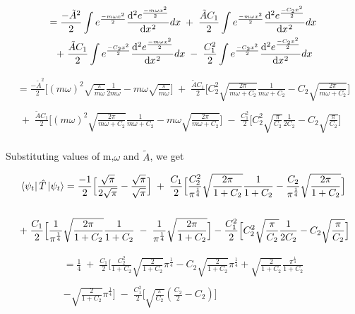 \documentclass[12pt]{article}
\begin{document}
\begin{multline*}   
= \frac{-\tilde{A}^2}{2} \int e^{\frac{-m \omega x^2}{2}} \diff[2]{e^{\frac{-m \omega x^2}{2}}}{x} dx \;+\;  
\frac{\tilde{A}C_1}{2} \int e^{\frac{-m \omega x^2}{2}} \diff[2]{e^{\frac{-C_2 x^2}{2}}}{x} dx \\
\;+\; \frac{\tilde{A}C_1}{2} \int e^{\frac{-C_2 x^2}{2}} \diff[2]{e^{\frac{-m \omega x^2}{2}}}{x} dx \;-\; 
\frac{C_1^2}{2} \int e^{\frac{-C_2 x^2}{2}} \diff[2]{e^{\frac{-C_2 x^2}{2}}}{x} dx 
\end{multline*} 

\newpage
\begin{multline*}
= \frac{- \tilde{A}^2}{2} \Big[(m\omega)^2 \sqrt{\frac{\pi}{m \omega}} \frac{1}{2 m \omega} - m\omega \sqrt{\frac{\pi}{m \omega}} 
\Big] \;+\; \frac{\tilde{A}C_1}{2} \Big[C_2^2 \sqrt{\frac{2 \pi}{m \omega + C_2}} \frac{1}{m \omega + C_2} - C_2 \sqrt{\frac{2 \pi}{m \omega + C_2}} \Big] \\
\\
\;+\; \frac{\tilde{A}C_1}{2} \Big[(m \omega)^2 \sqrt{\frac{2 \pi}{m \omega + C_2}} \frac{1}{m \omega + C_2} - 
m \omega \sqrt{\frac{2 \pi}{m \omega + C_2}} \Big] \;-\; \frac{C_1^2}{2} \Big[C_2^2 \sqrt{\frac{\pi}{C_2}} \frac{1}{2 C_2} - C_2 \sqrt{\frac{\pi}{C_2}} \Big]
\end{multline*}
\\
Substituting values of m,$\omega$ and $\tilde{A}$, we get 

\begin{multline*}
\bra{\psi_t}\hat{T}\ket{\psi_t} = \frac{-1}{2} \Big[\frac{\sqrt{\pi}}{2 \sqrt{\pi}} - \frac{\sqrt{\pi}}{\sqrt{\pi}} 
\Big] \;+\; \frac{C_1}{2} \Big[\frac{C_2^2}{\pi^\frac{1}{4}} \sqrt{\frac{2\pi}{1 + C_2}}\frac{1}{1 + C_2} - \frac{C_2}{\pi^\frac{1}{4}}\sqrt{\frac{2\pi}{1+C_2}} \Big] \\
\\
\;+\; \frac{C_1}{2} \Big[\frac{1}{\pi^\frac{1}{4}} \sqrt{\frac{2\pi}{1 + C_2}}\frac{1}{1 + C_2} \;-\; 
\frac{1}{\pi^\frac{1}{4}}\sqrt{\frac{2\pi}{1+C_2}} \Big] - \frac{C_1^2}{2} \Big[C_2^2 \sqrt{\frac{\pi}{C_2}}\frac{1}{2C_2} - C_2 \sqrt{\frac{\pi}{C_2}} \Big]
\end{multline*}

\begin{multline*}
= \frac{1}{4} \;+\; \frac{C_1}{2} \Big[\frac{C_2^2}{1 + C_2}\sqrt{\frac{2}{1 + C_2}} \pi^\frac{1}{4} - C_2 
\sqrt{\frac{2}{1 + C_2}} \pi^\frac{1}{4} + \sqrt{\frac{2}{1 + C_2}} \frac{\pi ^ \frac{1}{4}}{1 + C_2} \\
\\
- \sqrt{\frac{2}{1 + C_2}}\pi^\frac{1}{4} \Big] 
\;-\; \frac{C_1^2}{2} \Big[\sqrt{\frac{\pi}{C_2}} (\frac{C_2}{2} - C_2) \Big] 
\end{multline*}
\end{document}
